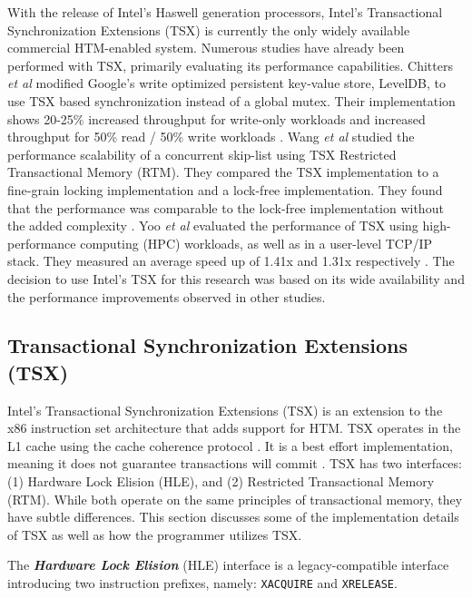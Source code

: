 \documentclass{sig-alternate}
\begin{document}
With the release of Intel's Haswell generation processors, Intel's Transactional
Synchronization Extensions (TSX) is currently the only widely available commercial
HTM-enabled system.  Numerous studies have already been performed with TSX, primarily
evaluating its performance capabilities.  Chitters \emph{et al} modified Google's write
optimized persistent key-value store, LevelDB, to use TSX based synchronization instead of
a global mutex.  Their implementation shows 20-25\% increased throughput for write-only
workloads and increased throughput for 50\% read / 50\% write workloads
\cite{chitters_tsx}.  Wang \emph{et al} studied the performance scalability of a
concurrent skip-list using TSX Restricted Transactional Memory (RTM).  They compared the
TSX implementation to a fine-grain locking implementation and a lock-free implementation.
They found that the performance was comparable to the lock-free implementation without the
added complexity \cite{wang_tsx}.  Yoo \emph{et al} evaluated the performance of TSX using
high-performance computing (HPC) workloads, as well as in a user-level TCP/IP stack.  They
measured an average speed up of 1.41x and 1.31x respectively \cite{yoo_tsx}.  The decision
to use Intel's TSX for this research was based on its wide availability and the
performance improvements observed in other studies.

\subsection{Transactional Synchronization Extensions (TSX)}

Intel's Transactional Synchronization Extensions (TSX) is an extension to the x86
instruction set architecture that adds support for HTM.  TSX operates in the L1 cache
using the cache coherence protocol \cite{intel_opt_man}.  It is a best effort
implementation, meaning it does not guarantee transactions will commit
\cite{intel_prog_ref}.  TSX has two interfaces: (1) Hardware Lock Elision (HLE), and (2)
Restricted Transactional Memory (RTM).  While both operate on the same principles of
transactional memory, they have subtle differences.  This section discusses some of the
implementation details of TSX as well as how the programmer utilizes TSX.

The \emph{\textbf{Hardware Lock Elision}} (HLE) interface is a legacy-compatible interface
introducing two instruction prefixes, namely: \texttt{XACQUIRE} and \texttt{XRELEASE}.
\end{document}
